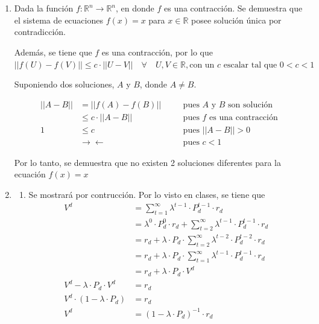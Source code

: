 \documentclass[letterpaper,10pt]{article}
\begin{document}
\section{}

\begin{enumerate}
\item Dada la función $f : \mathds{R}^n \rightarrow \mathds{R}^n$, en donde $f$ es una contracción. Se demuestra que el sistema de ecuaciones $f(x) = x$ para $x \in \mathds{R}$ posee solución única por contradicción. 

Además, se tiene que $f$ es una contracción, por lo que $||f(U) - f(V)|| \leq c \cdot ||U - V|| \quad \forall \quad U, V \in \mathds{R}, \text{con un $c$ escalar tal que } 0 < c < 1$

Suponiendo dos soluciones, $A$ y $B$, donde $A \neq B$. 

\[
    \begin{aligned}
        ||A - B||  &= ||f(A) - f(B)|| \quad & &\text{pues $A$ y $B$ son solución}\\
        &\leq c \cdot ||A - B|| \quad & &\text{pues $f$ es una contracción} \\
        1 &\leq c \quad & &\text{pues } ||A - B|| > 0 \\
        &\rightarrow \leftarrow \quad & &\text{pues } c < 1
    \end{aligned}
\]

Por lo tanto, se demuestra que no existen 2 soluciones diferentes para la ecuación $f(x) = x$

\item 
    \begin{enumerate}
        \item Se mostrará por contrucción. 
        Por lo visto en clases, se tiene que 
        \[
        \begin{aligned}
            V^d  &= \sum\limits_{t=1}^{\infty} \lambda ^{t-1}\cdot  P_d^{t-1} \cdot r_d \\
            &=\lambda ^{0}\cdot  P_d^{0} \cdot r_d + \sum\limits_{t=2}^{\infty} \lambda ^{t-1}\cdot  P_d^{t-1} \cdot r_d \\
            &= r_d +\lambda \cdot P_d \cdot  \sum \limits_{t=2}^{\infty} \lambda ^{t-2}\cdot  P_d^{t-2} \cdot r_d \\
            &= r_d +\lambda \cdot P_d \cdot  \sum \limits_{t=1}^{\infty} \lambda ^{t-1}\cdot  P_d^{t-1} \cdot r_d \\
            &= r_d +\lambda \cdot P_d \cdot  V^d \\
            V^d - \lambda \cdot P_d \cdot  V^d &= r_d \\
            V^d\cdot(1-\lambda \cdot P_d) &= r_d \\
            V^d &= (1- \lambda \cdot P_d)^{-1} \cdot r_d
        \end{aligned}
        \]
        

\end{enumerate}
\end{enumerate}
\end{document}

